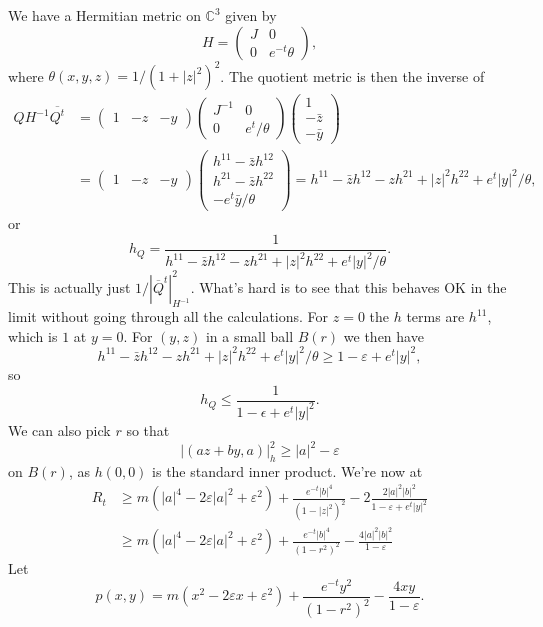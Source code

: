 \documentclass[10pt,a4paper]{amsart}
\newcommand{\kk}[1]{\mathbb{#1}}
\def\ov#1{\overline{#1}}
\begin{document}
We have a Hermitian metric on $\kk C^3$ given by
$$
H = \begin{pmatrix}
	J & 0
	\\
	0 & e^{-t} \theta
\end{pmatrix},
$$
where $\theta(x,y,z) = 1 / (1+|z|^2)^2$.
The quotient metric is then the inverse of
\begin{align*}
Q H^{-1} \ov{Q^t}
&= \begin{pmatrix} 1 & -z & -y \end{pmatrix}
\begin{pmatrix}
J^{-1} & 0
\\
0 & e^t/\theta
\end{pmatrix}
\begin{pmatrix} 1 \\ -\bar z \\ -\bar y \end{pmatrix}
\\
&= \begin{pmatrix} 1 & -z & -y \end{pmatrix}
\begin{pmatrix}
h^{11} - \bar z h^{12}
\\
h^{21} - \bar z h^{22}
\\
-e^t \bar y/\theta
\end{pmatrix}
= h^{11} - \bar z h^{12} - z h^{21} + |z|^2 h^{22} + e^t |y|^2 / \theta,
\end{align*}
or
$$
h_Q
= \frac{1}{h^{11} - \bar z h^{12} - z h^{21} + |z|^2 h^{22} + e^t |y|^2 / \theta}.
$$
This is actually just $1 / |\ov Q^t|^2_{H^{-1}}$.
What's hard is to see that this behaves OK in the limit without going through
all the calculations.
For $z = 0$ the $h$ terms are $h^{11}$, which is $1$ at $y = 0$.
For $(y,z)$ in a small ball $B(r)$ we then have
$$
h^{11} - \bar z h^{12} - z h^{21} + |z|^2 h^{22} + e^t |y|^2 / \theta
\geq 1 - \varepsilon + e^t |y|^2,
$$
so
$$
h_Q \leq \frac{1}{1 - \epsilon + e^t|y|^2}.
$$
We can also pick $r$ so that
$$
|(az + by, a)|_h^2 \geq |a|^2 - \varepsilon
$$
on $B(r)$, as $h(0,0)$ is the standard inner product. We're now at
\begin{align*}
R_t &\geq
m (|a|^4 - 2\varepsilon|a|^2 + \varepsilon^2)
+ \frac{e^{-t}|b|^4}{(1-|z|^2)^2}
- 2 \frac{2 |a|^2|b|^2}{1 - \varepsilon + e^t |y|^2}
\\
&\geq
m (|a|^4 - 2\varepsilon|a|^2 + \varepsilon^2)
+ \frac{e^{-t}|b|^4}{(1-r^2)^2}
- \frac{4 |a|^2|b|^2}{1 - \varepsilon}
\end{align*}
Let
$$
p(x,y)
= m(x^2 - 2\varepsilon x + \varepsilon^2)
+ \frac{e^{-t}y^2}{(1-r^2)^2}
- \frac{4xy}{1 - \varepsilon}.
$$
\end{document}
